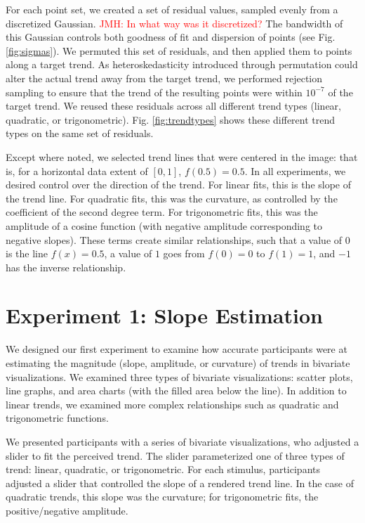 \documentclass{sigchi}
\newcommand{\jeff}[1]{\textcolor{red}{JMH: #1}}
\begin{document}
For each point set, we created a set of residual values, sampled evenly from a discretized Gaussian. \jeff{In what way was it discretized?} The bandwidth of this Gaussian controls both goodness of fit and dispersion of points (see Fig. \ref{fig:sigmas}). We permuted this set of residuals, and then applied them to points along a target trend. As heteroskedasticity introduced through permutation could alter the actual trend away from the target trend, we performed rejection sampling to ensure that the trend of the resulting points were within $10^{-7}$ of the target trend. We reused these residuals across all different trend types (linear, quadratic, or trigonometric). Fig. \ref{fig:trendtypes} shows these different trend types on the same set of residuals.

Except where noted, we selected trend lines that were centered in the image: that is, for a horizontal data extent of $[0,1]$, $f(0.5) = 0.5$. In all experiments, we desired control over the direction of the trend. For linear fits, this is the slope of the trend line. For quadratic fits, this was the curvature, as controlled by the coefficient of the second degree term. For trigonometric fits, this was the amplitude of a cosine function (with negative amplitude corresponding to negative slopes). These terms create similar relationships, such that a value of $0$ is the line $f(x)=0.5$, a value of $1$ goes from $f(0)=0$ to $f(1)=1$, and $-1$ has the inverse relationship.


\section{Experiment 1: Slope Estimation}

We designed our first experiment to examine how accurate participants were at estimating the magnitude (slope, amplitude, or curvature) of trends in bivariate visualizations. We examined three types of bivariate visualizations: scatter plots, line graphs, and area charts (with the filled area below the line). In addition to linear trends, we examined more complex relationships such as quadratic and trigonometric functions.

We presented participants with a series of bivariate visualizations, who adjusted a slider to fit the perceived trend. The slider parameterized one of three types of trend: linear, quadratic, or trigonometric. For each stimulus, participants adjusted a slider that controlled the slope of a rendered trend line. In the case of quadratic trends, this slope was the curvature; for trigonometric fits, the positive/negative amplitude.
\end{document}
